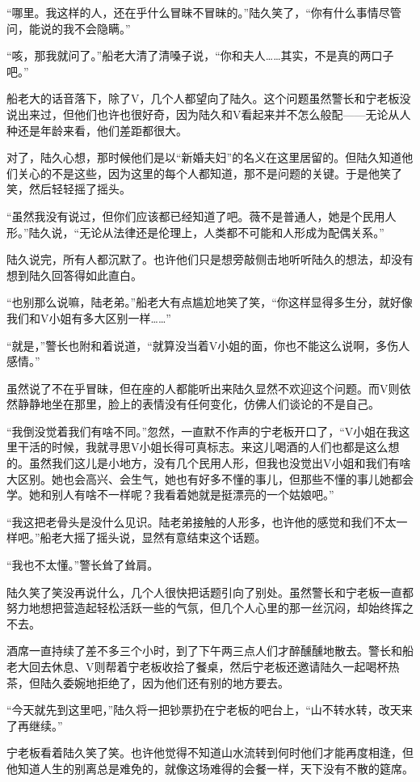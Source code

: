 “哪里。我这样的人，还在乎什么冒昧不冒昧的。”陆久笑了，“你有什么事情尽管问，能说的我不会隐瞒。”

“咳，那我就问了。”船老大清了清嗓子说，“你和夫人……其实，不是真的两口子吧。”

船老大的话音落下，除了V，几个人都望向了陆久。这个问题虽然警长和宁老板没说出来过，但他们也许也很好奇，因为陆久和V看起来并不怎么般配——无论从人种还是年龄来看，他们差距都很大。

对了，陆久心想，那时候他们是以“新婚夫妇”的名义在这里居留的。但陆久知道他们关心的不是这些，因为这里的每个人都知道，那不是问题的关键。于是他笑了笑，然后轻轻摇了摇头。

“虽然我没有说过，但你们应该都已经知道了吧。薇不是普通人，她是个民用人形。”陆久说，“无论从法律还是伦理上，人类都不可能和人形成为配偶关系。”

陆久说完，所有人都沉默了。也许他们只是想旁敲侧击地听听陆久的想法，却没有想到陆久回答得如此直白。

“也别那么说嘛，陆老弟。”船老大有点尴尬地笑了笑，“你这样显得多生分，就好像我们和V小姐有多大区别一样……”

“就是，”警长也附和着说道，“就算没当着V小姐的面，你也不能这么说啊，多伤人感情。”

虽然说了不在乎冒昧，但在座的人都能听出来陆久显然不欢迎这个问题。而V则依然静静地坐在那里，脸上的表情没有任何变化，仿佛人们谈论的不是自己。

“我倒没觉着我们有啥不同。”忽然，一直默不作声的宁老板开口了，“V小姐在我这里干活的时候，我就寻思V小姐长得可真标志。来这儿喝酒的人们也都是这么想的。虽然我们这儿是小地方，没有几个民用人形，但我也没觉出V小姐和我们有啥大区别。她也会高兴、会生气，她也有好多不懂的事儿，但那些不懂的事儿她都会学。她和别人有啥不一样呢？我看着她就是挺漂亮的一个姑娘吧。”

“我这把老骨头是没什么见识。陆老弟接触的人形多，也许他的感觉和我们不太一样吧。”船老大摇了摇头说，显然有意结束这个话题。

“我也不太懂。”警长耸了耸肩。

陆久笑了笑没再说什么，几个人很快把话题引向了别处。虽然警长和宁老板一直都努力地想把营造起轻松活跃一些的气氛，但几个人心里的那一丝沉闷，却始终挥之不去。

酒席一直持续了差不多三个小时，到了下午两三点人们才醉醺醺地散去。警长和船老大回去休息、V则帮着宁老板收拾了餐桌，然后宁老板还邀请陆久一起喝杯热茶，但陆久委婉地拒绝了，因为他们还有别的地方要去。

“今天就先到这里吧，”陆久将一把钞票扔在宁老板的吧台上，“山不转水转，改天来了再继续。”

宁老板看着陆久笑了笑。也许他觉得不知道山水流转到何时他们才能再度相逢，但他知道人生的别离总是难免的，就像这场难得的会餐一样，天下没有不散的筵席。

